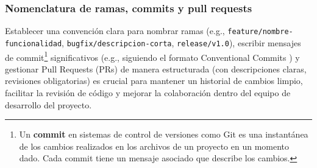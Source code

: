\subsubsection{Nomenclatura de ramas, commits y pull requests}
Establecer una convención clara para nombrar ramas (e.g., \texttt{feature/nombre-funcionalidad}, \texttt{bugfix/descripcion-corta}, \texttt{release/v1.0}), escribir mensajes de commit\footnote{Un \textbf{commit} en sistemas de control de versiones como Git es una instantánea de los cambios realizados en los archivos de un proyecto en un momento dado.
Cada commit tiene un mensaje asociado que describe los cambios.} significativos (e.g., siguiendo el formato Conventional Commits \parencite{ConventionalCommits}) y gestionar Pull Requests (PRs) de manera estructurada (con descripciones claras, revisiones obligatorias) es crucial para mantener un historial de cambios limpio, facilitar la revisión de código y mejorar la colaboración dentro del equipo de desarrollo del proyecto.
